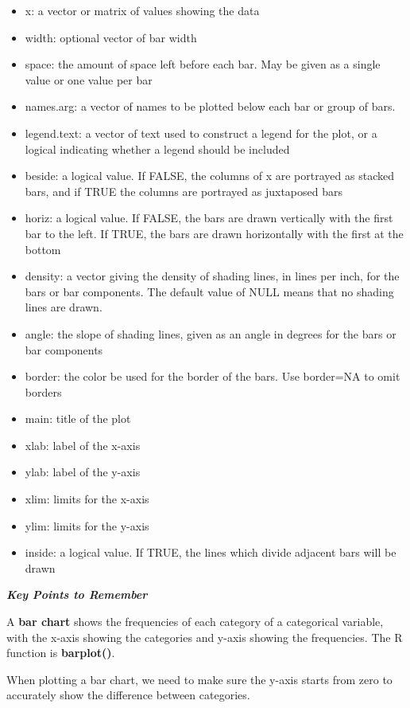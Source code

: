 \begin{itemize}
\item
  x: a vector or matrix of values showing the data
\item
  width: optional vector of bar width
\item
  space: the amount of space left before each bar. May be given as a
  single value or one value per bar
\item
  names.arg: a vector of names to be plotted below each bar or group of
  bars.
\item
  legend.text: a vector of text used to construct a legend for the plot,
  or a logical indicating whether a legend should be included
\item
  beside: a logical value. If FALSE, the columns of x are portrayed as
  stacked bars, and if TRUE the columns are portrayed as juxtaposed bars
\item
  horiz: a logical value. If FALSE, the bars are drawn vertically with
  the first bar to the left. If TRUE, the bars are drawn horizontally
  with the first at the bottom
\item
  density: a vector giving the density of shading lines, in lines per
  inch, for the bars or bar components. The default value of NULL means
  that no shading lines are drawn.
\item
  angle: the slope of shading lines, given as an angle in degrees for
  the bars or bar components
\item
  border: the color be used for the border of the bars. Use border=NA to
  omit borders
\item
  main: title of the plot
\item
  xlab: label of the x-axis
\item
  ylab: label of the y-axis
\item
  xlim: limits for the x-axis
\item
  ylim: limits for the y-axis
\item
  inside: a logical value. If TRUE, the lines which divide adjacent bars
  will be drawn
\end{itemize}

\emph{\textbf{Key Points to Remember}}

A \textbf{bar chart} shows the frequencies of each category of a
categorical variable, with the x-axis showing the categories and y-axis
showing the frequencies. The R function is \textbf{barplot()}.

When plotting a bar chart, we need to make sure the y-axis starts from
zero to accurately show the difference between categories.

